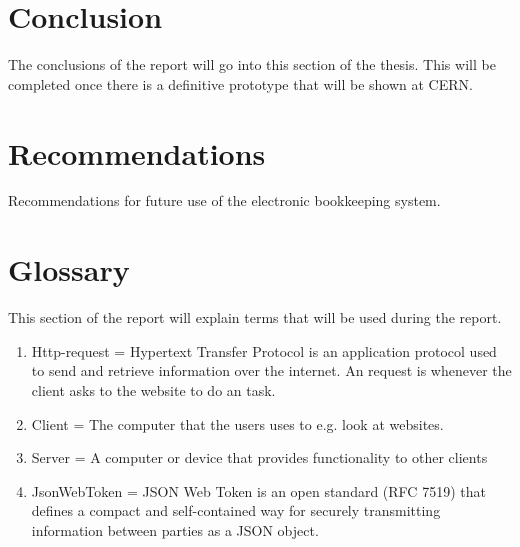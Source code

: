 \documentclass[paper=a4, fontsize=11pt,twoside]{scrartcl}	%
\begin{document}
\newpage
\section{Conclusion}
The conclusions of the report will go into this section of the thesis. This will be completed once there is a definitive prototype that will be shown at CERN.
\newpage
\section{Recommendations}
Recommendations for future use of the electronic bookkeeping system.
\newpage

\section{Glossary}
This section of the report will explain terms that will be used during the report. 
\begin{enumerate}
\item Http-request = Hypertext Transfer Protocol is an application protocol used to send and retrieve information over the internet. An request is whenever the client asks to the website to do an task.
\item Client = The computer that the users uses to e.g. look at websites.
\item Server = A computer or device that provides functionality to other clients
\item JsonWebToken = JSON Web Token is an open standard (RFC 7519) that defines a compact and self-contained way for securely transmitting information between parties as a JSON object.
\end{enumerate}


\newpage
\end{document}
